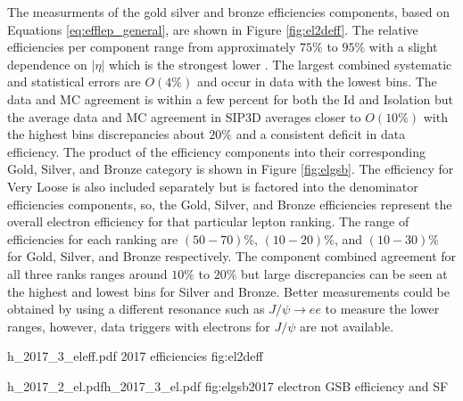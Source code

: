 The measurments of the gold silver and bronze efficiencies components, based on Equations \ref{eq:efflep_general}, are shown in Figure \ref{fig:el2deff}. The relative efficiencies per component range from approximately $75\%$ to $95\%$ with a slight dependence on $|\eta|$ which is the strongest lower \pt. The largest combined systematic and statistical errors are $O(4\%)$ and occur in data with the lowest \pt bins. The data and MC agreement is within a few percent for both the Id and Isolation but the average data and MC agreement in SIP3D averages closer to $O(10\%)$ with the highest \pt bins discrepancies about $20\%$ and a consistent deficit in data efficiency. The product of the efficiency components into their corresponding Gold, Silver, and Bronze category is shown in Figure \ref{fig:elgsb}. The efficiency for Very Loose is also included separately but is factored into the denominator efficiencies components, so, the Gold, Silver, and Bronze efficiencies represent the overall electron efficiency for that particular lepton ranking. The range of efficiencies for each ranking are $(50-70)\%$, $(10-20)\%$, and $(10-30)\%$ for Gold, Silver, and Bronze respectively. The component combined agreement for all three ranks ranges around $10\%$ to $20\%$ but large discrepancies can be seen at the highest and lowest \pt bins for Silver and Bronze. Better measurements could be obtained by using a different resonance such as $J/\psi \rightarrow ee$ to measure the lower \pt ranges, however, data triggers with electrons for $J/\psi$ are not available.

%
           {h_2017_3_eleff.pdf}%
         {2017 efficiencies} {fig:el2deff}


%
           {h_2017_2_el.pdf}{h_2017_3_el.pdf}%
          {fig:elgsb}{2017 electron GSB efficiency and SF }

\FloatBarrier
